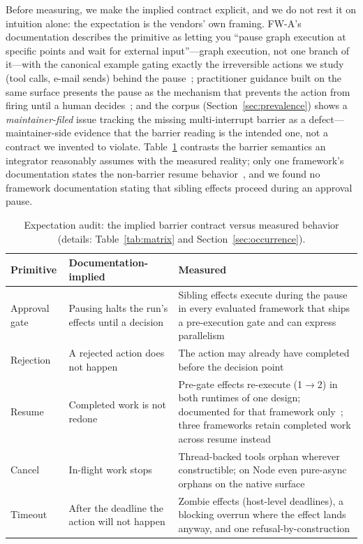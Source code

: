 \documentclass[10pt,journal,compsoc]{IEEEtran}
\begin{document}
Before measuring, we make the implied contract explicit, and we do not rest
it on intuition alone: the expectation is the vendors' own framing.
\textsf{FW-A}'s documentation describes the primitive as letting you ``pause
graph execution at specific points and wait for external input''---graph
execution, not one branch of it---with the canonical example gating exactly
the irreversible actions we study (tool calls, e-mail sends) behind the
pause~\cite{lgdocs26}; practitioner guidance built on the same surface
presents the pause as the mechanism that prevents the action from firing
until a human decides~\cite{abstractalg26}; and the corpus
(Section~\ref{sec:prevalence}) shows a \emph{maintainer-filed} issue
tracking the missing multi-interrupt barrier as a defect---maintainer-side
evidence that the barrier reading is the intended one, not a contract we
invented to violate.
Table~\ref{tab:audit} contrasts the barrier semantics an integrator reasonably
assumes with the measured reality; only one framework's documentation states the
non-barrier resume behavior~\cite{lgdocs26}, and we found no framework
documentation stating that sibling effects proceed during an approval pause.

\begin{table}[!t]
\centering
\caption{Expectation audit: the implied barrier contract versus measured
behavior (details: Table~\ref{tab:matrix} and Section~\ref{sec:occurrence}).}
\label{tab:audit}
\renewcommand{\arraystretch}{1.2}
\footnotesize
\begin{tabularx}{\columnwidth}{@{}p{1.55cm}XX@{}}
\toprule
\textbf{Primitive} & \textbf{Documentation-implied} & \textbf{Measured}\\
\midrule
Approval gate & Pausing halts the run's effects until a decision & Sibling
effects execute during the pause in every evaluated framework that ships a
pre-execution gate and can express parallelism\\
Rejection & A rejected action does not happen & The action may already have
completed before the decision point\\
Resume & Completed work is not redone & Pre-gate effects re-execute
(1$\to$2) in both runtimes of one design; documented for that framework
only~\cite{lgdocs26}; three frameworks retain completed work across resume
instead\\
Cancel & In-flight work stops & Thread-backed tools orphan wherever
constructible; on Node even pure-async orphans on the native surface\\
Timeout & After the deadline the action will not happen & Zombie effects
(host-level deadlines), a blocking overrun where the effect lands anyway, and
one refusal-by-construction\\
\bottomrule
\end{tabularx}
\end{table}
\end{document}
